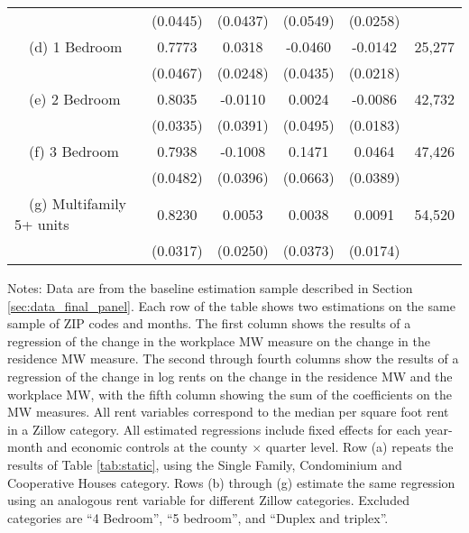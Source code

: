 \begin{landscape}
\begin{table}[ht!]
\begin{tabular}{@{}lccccc@{}}
                                                 & (0.0445) & (0.0437) & (0.0549) & (0.0258) &      \\
        $\quad$(d) 1 Bedroom                     &  0.7773  &  0.0318  &  -0.0460  &  -0.0142  & 25,277 \\
                                                 & (0.0467) & (0.0248) & (0.0435) & (0.0218) &      \\
        $\quad$(e) 2 Bedroom                     &  0.8035  &  -0.0110  &  0.0024  &  -0.0086  & 42,732 \\
                                                 & (0.0335) & (0.0391) & (0.0495) & (0.0183) &      \\
        $\quad$(f) 3 Bedroom                     &  0.7938  &  -0.1008  &  0.1471  &  0.0464  & 47,426 \\
                                                 & (0.0482) & (0.0396) & (0.0663) & (0.0389) &      \\
        $\quad$(g) Multifamily 5+ units          &  0.8230  &  0.0053  &  0.0038  &  0.0091  & 54,520 \\
                                                 & (0.0317) & (0.0250) & (0.0373) & (0.0174) &      \\ \bottomrule
    \end{tabular}

    \begin{minipage}{.95\linewidth} \footnotesize
        \vspace{2mm}
        Notes:
        Data are from the baseline estimation sample described in Section 
        \ref{sec:data_final_panel}.
        Each row of the table shows two estimations on the same sample of ZIP 
        codes and months.
        The first column shows the results of a regression of the change in the 
        workplace MW measure on the change in the residence MW measure.
        The second through fourth columns show the results of a regression of 
        the change in log rents on the change in the residence MW and the 
        workplace MW, with the fifth column showing the sum of the coefficients 
        on the MW measures.
        All rent variables correspond to the median per square foot rent in a 
        Zillow category.
        All estimated regressions include fixed effects for each year-month and 
        economic controls at the county $\times$ quarter level.
        Row (a) repeats the results of Table \ref{tab:static}, using the 
        Single Family, Condominium and Cooperative Houses category.
        Rows (b) through (g) estimate the same regression using an analogous 
        rent variable for different Zillow categories.
        Excluded categories are ``4 Bedroom'', ``5 bedroom'', and 
        ``Duplex and triplex''.
    \end{minipage}
\end{table}
\end{landscape}
